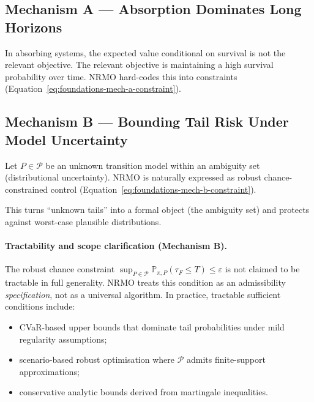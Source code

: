 \subsection{Mechanism A --- Absorption Dominates Long Horizons}
\label{sec:foundations-5-1-mechanism-a}

In absorbing systems, the expected value conditional on survival is
not the relevant objective. The relevant objective is maintaining a
high survival probability over time. NRMO hard-codes this into
constraints (Equation~\ref{eq:foundations-mech-a-constraint}).

\subsection{Mechanism B --- Bounding Tail Risk Under Model
Uncertainty}
\label{sec:foundations-5-2-mechanism-b}

Let $P \in \mathcal{P}$ be an unknown transition model within an
ambiguity set (distributional uncertainty). NRMO is naturally
expressed as robust chance-constrained control
(Equation~\ref{eq:foundations-mech-b-constraint}).

This turns ``unknown tails'' into a formal object (the ambiguity
set) and protects against worst-case plausible distributions.


\paragraph{Tractability and scope clarification (Mechanism B).}
The robust chance constraint
$\sup_{P \in \mathcal{P}} \mathbb{P}_{\pi, P}(\tau_F \le T) \le
\varepsilon$ is not claimed to be tractable in full generality. NRMO
treats this condition as an admissibility \emph{specification}, not
as a universal algorithm. In practice, tractable sufficient
conditions include:

\begin{itemize}
\item CVaR-based upper bounds that dominate tail probabilities under
mild regularity assumptions;
\item scenario-based robust optimisation where $\mathcal{P}$ admits
finite-support approximations;
\item conservative analytic bounds derived from martingale
inequalities.
\end{itemize}

